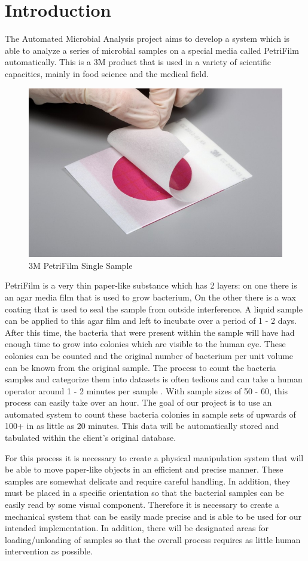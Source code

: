 \documentclass[11pt]{article}
\begin{document}
\section{Introduction}

The Automated Microbial Analysis project aims to develop a system which is able to analyze a series of microbial samples on a special media called PetriFilm \cite{beveragedaily.com2014May} automatically. This is a 3M product that is used in a variety of scientific capacities, mainly in food science and the medical field. 

\begin{figure}[H]
    \centering
    \includegraphics[width = .5\textwidth]{Pictures/3MPetrifilm.jpg}
    \caption{3M PetriFilm Single Sample}
    \label{fig:Petrifilm}
\end{figure}



PetriFilm is a very thin paper-like substance which has 2 layers: on one there is an agar media film that is used to grow bacterium, On the other there is a wax coating that is used to seal the sample from outside interference. A liquid sample can be applied to this agar film and left to incubate over a period of 1 - 2 days. After this time, the bacteria that were present within the sample will have  had enough time to grow into colonies which are visible to the human eye. These colonies can be counted and the original number of bacterium per unit volume can be known from the original sample. The process to count the bacteria samples and categorize them into datasets is often tedious and can take a human operator around 1 - 2 minutes per sample \cite{3M_Interpretation}. With sample sizes of 50 - 60, this process can easily take over an hour. The goal of our project is to use an automated system to count these bacteria colonies in sample sets of upwards of 100+ in as little as 20 minutes. This data will be automatically stored and tabulated within the client's original database. 



For this process it is necessary to create a physical manipulation system that will be able to move paper-like objects in an efficient and precise manner. These samples are somewhat delicate and require careful handling. In addition, they must be placed in a specific orientation so that the bacterial samples can be easily read by some visual component. Therefore it is necessary to create a mechanical system that can be easily made precise and is able to be used for our intended implementation. In addition, there will be designated areas for loading/unloading of samples so that the overall process requires as little human intervention as possible.  
\end{document}
